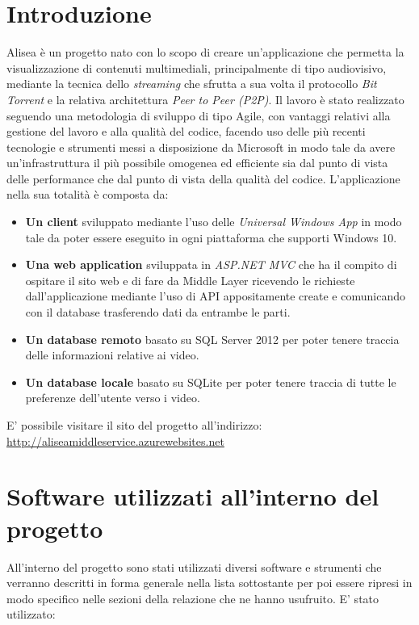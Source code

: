 \documentclass[a4]{book}
\begin{document}
\chapter{Introduzione}

Alisea è un progetto nato con lo scopo di creare un'applicazione che permetta la visualizzazione di contenuti multimediali, principalmente di tipo audiovisivo, mediante la tecnica dello \textit{streaming} che sfrutta a sua volta il protocollo \textit{Bit Torrent} e la relativa architettura \textit{Peer to Peer (P2P)}. Il lavoro è stato realizzato seguendo una metodologia di sviluppo di tipo Agile, con vantaggi relativi alla gestione del lavoro e alla qualità del codice, facendo uso  delle più recenti tecnologie e strumenti messi a disposizione da Microsoft in modo tale da avere un'infrastruttura il più possibile omogenea ed efficiente sia dal punto di vista delle performance che dal punto di vista della qualità del codice. L'applicazione nella sua totalità è composta da:

\begin{itemize}
	
	\item \textbf{Un client} sviluppato mediante l'uso delle \textit{Universal Windows App} in modo tale da poter essere eseguito in ogni piattaforma che supporti Windows 10.
	\item \textbf{Una web application} sviluppata in \textit{ASP.NET MVC} che ha il compito di ospitare il sito web e di fare da Middle Layer ricevendo le richieste dall'applicazione mediante l'uso di API appositamente create e comunicando con il database trasferendo dati da entrambe le parti.
	\item \textbf{Un database remoto} basato su SQL Server 2012 per poter tenere traccia delle informazioni relative ai video.
	\item \textbf{Un database locale} basato su SQLite per poter tenere traccia di tutte le preferenze dell'utente verso i video.
	  
\end{itemize}
E' possibile visitare il sito del progetto all'indirizzo: \url{http://aliseamiddleservice.azurewebsites.net }


\chapter{Software utilizzati all'interno del progetto}

All'interno del progetto sono stati utilizzati diversi software e strumenti che verranno descritti in forma generale nella lista sottostante per poi essere ripresi in modo specifico nelle sezioni della relazione che ne hanno usufruito. E' stato utilizzato:
\end{document}
